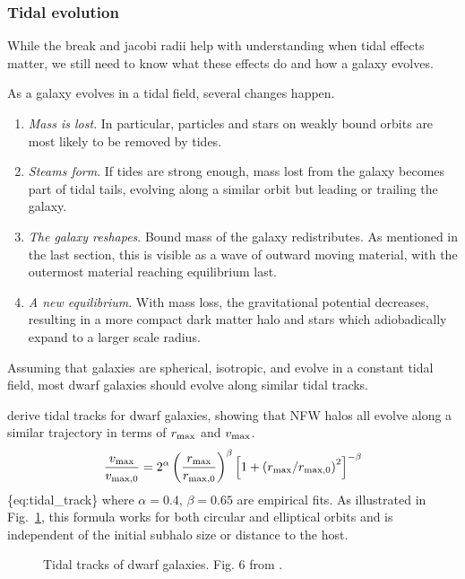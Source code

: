 \subsubsection{Tidal evolution}\label{tidal-evolution}

While the break and jacobi radii help with understanding when tidal
effects matter, we still need to know what these effects do and how a
galaxy evolves.

As a galaxy evolves in a tidal field, several changes happen.

\begin{enumerate}
\def\labelenumi{\arabic{enumi}.}
\tightlist
\item
  \emph{Mass is lost}. In particular, particles and stars on weakly
  bound orbits are most likely to be removed by tides.
\item
  \emph{Steams form}. If tides are strong enough, mass lost from the
  galaxy becomes part of tidal tails, evolving along a similar orbit but
  leading or trailing the galaxy.
\item
  \emph{The galaxy reshapes}. Bound mass of the galaxy redistributes. As
  mentioned in the last section, this is visible as a wave of outward
  moving material, with the outermost material reaching equilibrium
  last.
\item
  \emph{A new equilibrium}. With mass loss, the gravitational potential
  decreases, resulting in a more compact dark matter halo and stars
  which adiobadically expand to a larger scale radius.
\end{enumerate}

Assuming that galaxies are spherical, isotropic, and evolve in a
constant tidal field, most dwarf galaxies should evolve along similar
tidal tracks.

\citet{EN2021} derive tidal tracks for dwarf galaxies, showing that NFW
halos all evolve along a similar trajectory in terms of \(r_{\rm max}\)
and \(v_{\rm max}\). \begin{equation}{
\frac{v_{\rm max}}{v_{\rm max, 0}} = 
2^\alpha 
\left(\frac{r_{\rm max}}{r_{\rm max, 0}}\right)^{\beta}\left[1 + \left(r_{\rm max} / r_{\rm max, 0}\right)^2\right]^{-\beta}
}\end{equation} \{eq:tidal\_track\} where \(\alpha=0.4\), \(\beta=0.65\)
are empirical fits. As illustrated in Fig.~\ref{fig:tidal_tracks}, this
formula works for both circular and elliptical orbits and is independent
of the initial subhalo size or distance to the host.

\begin{figure}
\centering
{}
\caption[Tidal tracks of dwarf galaxies]{Tidal tracks of dwarf galaxies.
Fig. 6 from \citet{EN2021}.}\label{fig:tidal_tracks}
\end{figure}


